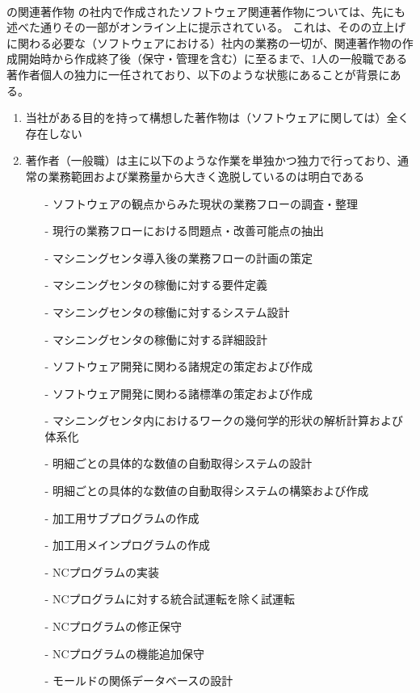 \clearpage
~\vfill
\begin{\Columnname}{\DMC の関連著作物}
\DMC の社内で作成されたソフトウェア関連著作物については、先にも述べた通りその一部がオンライン上に提示されている。
これは、その\DMC の立上げに関わる必要な（ソフトウェアにおける）社内の業務の一切が、関連著作物の作成開始時から作成終了後（保守・管理を含む）に至るまで、1人の一般職である著作者個人の独力に一任されており、以下のような状態にあることが背景にある。
\tcbline*
\begin{enumerate}[label=\Roman*]
\item 当社がある目的を持って構想した著作物は（ソフトウェアに関しては）全く存在しない
\item
著作者（一般職）は主に以下のような作業を単独かつ独力で行っており、通常の業務範囲および業務量から大きく逸脱しているのは明白である
  \begin{enumerate}
  \item[-] ソフトウェアの観点からみた現状の業務フローの調査・整理
  \item[-] 現行の業務フローにおける問題点・改善可能点の抽出
  \item[-] マシニングセンタ導入後の業務フローの計画の策定
  \item[-] マシニングセンタの稼働に対する要件定義
  \item[-] マシニングセンタの稼働に対するシステム設計
  \item[-] マシニングセンタの稼働に対する詳細設計
  \item[-] ソフトウェア開発に関わる諸規定の策定および作成
  \item[-] ソフトウェア開発に関わる諸標準の策定および作成
  \item[-] マシニングセンタ内におけるワークの幾何学的形状の解析計算および体系化
  \item[-] 明細ごとの具体的な数値の自動取得システムの設計
  \item[-] 明細ごとの具体的な数値の自動取得システムの構築および作成
  \item[-] 加工用サブプログラムの作成
  \item[-] 加工用メインプログラムの作成
  \item[-] NCプログラムの実装
  \item[-] NCプログラムに対する統合試運転を除く試運転
  \item[-] NCプログラムの修正保守
  \item[-] NCプログラムの機能追加保守
  \item[-] モールドの関係データベースの設計

\end{enumerate}
\end{enumerate}
\end{\Columnname}
